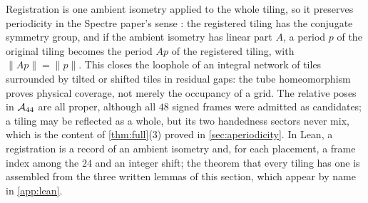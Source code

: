 Registration is one ambient isometry applied to the whole tiling, so it preserves periodicity in
the Spectre paper's sense \cite{SMKGS24b}: the registered tiling has the conjugate symmetry
group, and if the ambient isometry has linear part $A$, a period $p$ of the original tiling
becomes the period $Ap$ of the registered tiling, with $\|Ap\|=\|p\|$. This closes the loophole of an integral network of tiles surrounded by tilted or
shifted tiles in residual gaps: the tube homeomorphism proves physical coverage, not merely the
occupancy of a grid. The relative poses in $\mathcal{A}_{44}$ are all proper, although all $48$ signed
frames were admitted as candidates; a tiling may be reflected as a whole, but its two handedness
sectors never mix, which is the content of \cref{thm:full}(3) proved in \cref{sec:aperiodicity}.
In Lean, a registration is a record of an ambient isometry and, for each placement, a frame index
among the $24$ and an integer shift; the theorem that every tiling has one is assembled from the
three written lemmas of this section, which appear by name in \cref{app:lean}.
